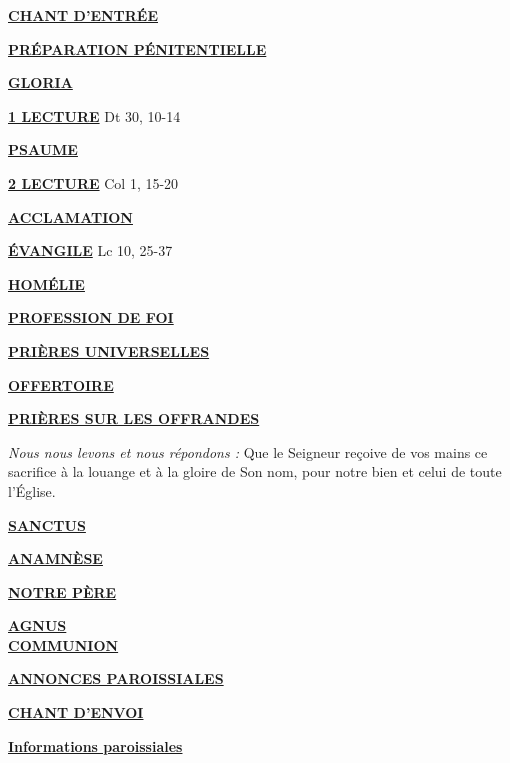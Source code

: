 \documentclass[french,11pt]{article}
\newcommand*{\chants}{../chants}
\newcommand*{\messe}{../messe_du_peuple_de_dieu}
\newcommand*{\pu}{../pu}
\newcommand*{\psaumes}{../psaumes}
\newcommand{\NewsItem}[1]{%
\vspace{3pt}
\underline{\textbf{#1}}
		  }
\begin{document}
\NewsItem{CHANT D'ENTRÉE}
	

\NewsItem{PRÉPARATION PÉNITENTIELLE}
	

\NewsItem{GLORIA}
	


\NewsItem{1\iere{} LECTURE} Dt 30, 10-14

\NewsItem{PSAUME}


\NewsItem{2\ieme{} LECTURE}  Col 1, 15-20

\NewsItem{ACCLAMATION}


\NewsItem{ÉVANGILE} Lc 10, 25-37

\NewsItem{HOMÉLIE}

\NewsItem{PROFESSION DE FOI}
%


\NewsItem{PRIÈRES UNIVERSELLES}


\NewsItem{OFFERTOIRE}

\NewsItem{PRIÈRES SUR LES OFFRANDES}
\textit{Nous nous levons et nous répondons : }
Que le Seigneur reçoive de vos mains ce sacrifice à la louange et à la gloire
de Son nom, pour notre bien et celui de toute l’Église.

\NewsItem{SANCTUS}


\NewsItem{ANAMNÈSE}


\NewsItem{NOTRE PÈRE}

\NewsItem{AGNUS} \\


\NewsItem{COMMUNION}


\NewsItem{ANNONCES PAROISSIALES}


\NewsItem{CHANT D'ENVOI}


\newpage



\NewsItem{Informations paroissiales}
\end{document}
